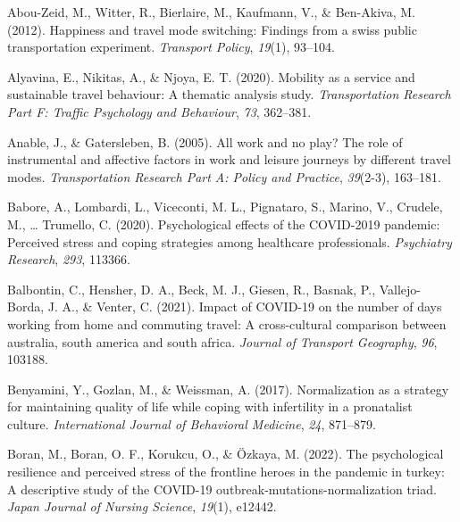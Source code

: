 \documentclass[
11pt, %
oneside, %
english, %
singlespacing, %
]{macthesis} %
\newlength{\cslhangindent}
\newenvironment{CSLReferences}[2] %
 {%
  \setlength{\parindent}{0pt}
  \ifodd #1 \everypar{\setlength{\hangindent}{\cslhangindent}}\ignorespaces\fi
  \ifnum #2 > 0
  \setlength{\parskip}{#2\baselineskip}
  \fi
 }%
 {}
\begin{document}
\hypertarget{refs}{}
\begin{CSLReferences}{1}{0}
\leavevmode{}%
Abou-Zeid, M., Witter, R., Bierlaire, M., Kaufmann, V., \& Ben-Akiva, M. (2012). Happiness and travel mode switching: Findings from a swiss public transportation experiment. \emph{Transport Policy}, \emph{19}(1), 93--104.

\leavevmode{}%
Alyavina, E., Nikitas, A., \& Njoya, E. T. (2020). Mobility as a service and sustainable travel behaviour: A thematic analysis study. \emph{Transportation Research Part F: Traffic Psychology and Behaviour}, \emph{73}, 362--381.

\leavevmode{}%
Anable, J., \& Gatersleben, B. (2005). All work and no play? The role of instrumental and affective factors in work and leisure journeys by different travel modes. \emph{Transportation Research Part A: Policy and Practice}, \emph{39}(2-3), 163--181.

\leavevmode{}%
Babore, A., Lombardi, L., Viceconti, M. L., Pignataro, S., Marino, V., Crudele, M., \ldots{} Trumello, C. (2020). Psychological effects of the COVID-2019 pandemic: Perceived stress and coping strategies among healthcare professionals. \emph{Psychiatry Research}, \emph{293}, 113366.

\leavevmode{}%
Balbontin, C., Hensher, D. A., Beck, M. J., Giesen, R., Basnak, P., Vallejo-Borda, J. A., \& Venter, C. (2021). Impact of COVID-19 on the number of days working from home and commuting travel: A cross-cultural comparison between australia, south america and south africa. \emph{Journal of Transport Geography}, \emph{96}, 103188.

\leavevmode{}%
Benyamini, Y., Gozlan, M., \& Weissman, A. (2017). Normalization as a strategy for maintaining quality of life while coping with infertility in a pronatalist culture. \emph{International Journal of Behavioral Medicine}, \emph{24}, 871--879.

\leavevmode{}%
Boran, M., Boran, O. F., Korukcu, O., \& Özkaya, M. (2022). The psychological resilience and perceived stress of the frontline heroes in the pandemic in turkey: A descriptive study of the COVID-19 outbreak-mutations-normalization triad. \emph{Japan Journal of Nursing Science}, \emph{19}(1), e12442.


\end{CSLReferences}
\end{document}
